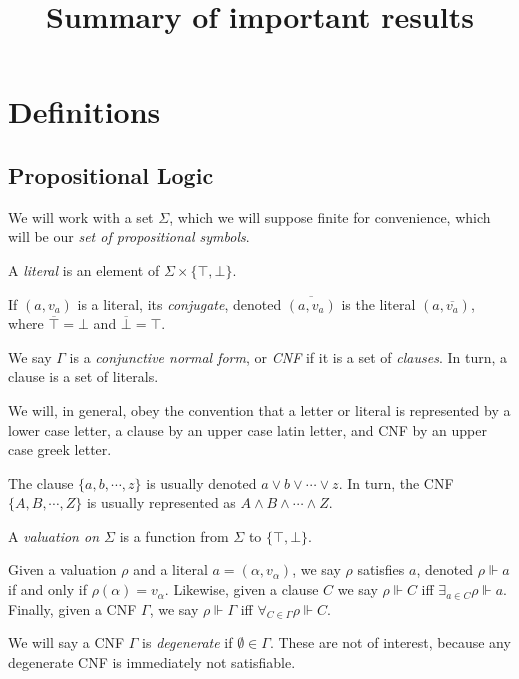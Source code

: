 \documentclass[11pt]{article}
\title{Summary of important results}
\author{}
\date{}
\newcommand{\conj}[1]{\overline{#1}}
\newcommand{\sat}{\Vdash}
\begin{document}
\maketitle

\tableofcontents

\section{Definitions}

\subsection{Propositional Logic}

We will work with a set $\Sigma$, which we will suppose finite for convenience, which will be our \emph{set of propositional symbols}.

A \emph{literal} is an element of $\Sigma \times \{\top, \bot\}$.

If $(a, v_a)$ is a literal, its \emph{conjugate}, denoted $\conj{(a,v_a)}$ is the literal $(a, \conj{v_a})$, where $\conj \top = \bot$ and $\conj \bot = \top$.

We say $\Gamma$ is a \emph{conjunctive normal form}, or \emph{CNF} if it is a set of \emph{clauses}. In turn, a clause is a set of literals.

We will, in general, obey the convention that a letter or literal is represented by a lower case letter, a clause by an upper case latin letter, and CNF by an upper case greek letter.

The clause $\{a,b,\cdots,z\}$ is usually denoted $a \vee b \vee \cdots \vee z$. In turn, the CNF $\{A, B, \cdots, Z\}$ is usually represented as $A \wedge B \wedge \cdots \wedge Z$.

A \emph{valuation on $\Sigma$} is a function from $\Sigma$ to $\{\top, \bot\}$.

Given a valuation $\rho$ and a literal $a = (\alpha, v_\alpha)$, we say $\rho$ satisfies $a$, denoted $\rho \sat a$ if and only if $\rho(\alpha) = v_\alpha$. Likewise, given a clause $C$ we say $\rho \sat C$ iff $\exists_{a \in C} \rho \sat a$. Finally, given a CNF $\Gamma$, we say $\rho \sat \Gamma$ iff $\forall_{C \in \Gamma} \rho \sat C$.

We will say a CNF $\Gamma$ is \emph{degenerate} if $\emptyset \in \Gamma$. These are not of interest, because any degenerate CNF is immediately not satisfiable.
\end{document}
